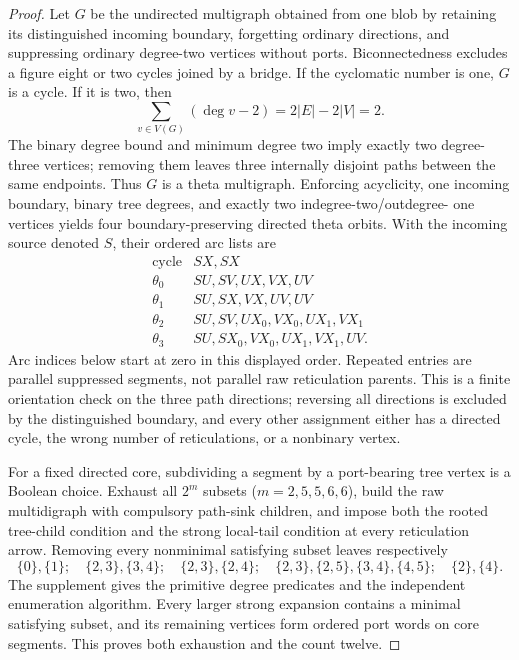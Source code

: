 \documentclass[11pt]{article}
\begin{document}
\begin{proof}
Let $G$ be the undirected multigraph obtained from one blob by retaining its
distinguished incoming boundary, forgetting ordinary directions, and
suppressing ordinary degree-two vertices without ports.  Biconnectedness
excludes a figure eight or two cycles joined by a bridge.  If the cyclomatic
number is one, $G$ is a cycle.  If it is two, then
\[
 \sum_{v\in V(G)}(\deg v-2)=2|E|-2|V|=2.
\]
The binary degree bound and minimum degree two imply exactly two degree-three
vertices; removing them leaves three internally disjoint paths between the
same endpoints.  Thus $G$ is a theta multigraph.  Enforcing acyclicity, one
incoming boundary, binary tree degrees, and exactly two indegree-two/outdegree-
one vertices yields four boundary-preserving directed theta orbits.  With the incoming source denoted $S$, their ordered arc lists are
\[
\begin{array}{c|l}
\text{cycle}& SX,SX\\
\theta_0& SU,SV,UX,VX,UV\\
\theta_1& SU,SX,VX,UV,UV\\
\theta_2& SU,SV,UX_0,VX_0,UX_1,VX_1\\
\theta_3& SU,SX_0,VX_0,UX_1,VX_1,UV.
\end{array}
\]
Arc indices below start at zero in this displayed order.  Repeated entries
are parallel suppressed segments, not parallel raw reticulation parents.  This is a finite
orientation check on the three path directions; reversing all directions is
excluded by the distinguished boundary, and every other assignment either has
a directed cycle, the wrong number of reticulations, or a nonbinary vertex.

For a fixed directed core, subdividing a segment by a port-bearing tree vertex
is a Boolean choice.  Exhaust all $2^m$ subsets ($m=2,5,5,6,6$), build the raw
multidigraph with compulsory path-sink children, and impose both the rooted
tree-child condition and the strong local-tail condition at every reticulation
arrow.  Removing every nonminimal satisfying subset leaves respectively
\[
 \{0\},\{1\};\quad
 \{2,3\},\{3,4\};\quad
 \{2,3\},\{2,4\};\quad
 \{2,3\},\{2,5\},\{3,4\},\{4,5\};\quad
 \{2\},\{4\}.
\]
The supplement gives the primitive degree predicates and the independent
enumeration algorithm.  Every larger strong expansion contains a minimal
satisfying subset, and its remaining vertices form ordered port words on core
segments.  This proves both exhaustion and the count twelve.
\end{proof}
\end{document}

